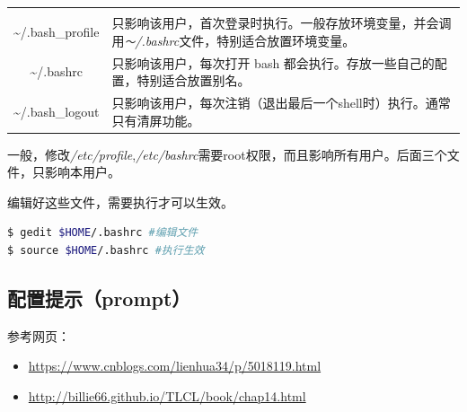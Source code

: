 \documentclass[doctor,openright,twoside]{sjtuthesis}
\providecommand{\tightlist}{%
    \setlength{\itemsep}{0pt}\setlength{\parskip}{0pt}}
\newcommand{\passthrough}[1]{#1}
\theoremstyle{plain}
\theoremstyle{definition}
\theoremstyle{remark}
\theoremstyle{ocrenumbox}
\theoremstyle{plain}
\begin{document}
\begin{longtable}[]{@{}cl@{}}
\begin{minipage}[t]{0.74\columnwidth}
\end{minipage}\tabularnewline
\begin{minipage}[t]{0.20\columnwidth}\centering
\textasciitilde{}/.bash\_profile\strut
\end{minipage} & \begin{minipage}[t]{0.74\columnwidth}\raggedright
只影响该用户，首次登录时执行。一般存放环境变量，并会调用\emph{\passthrough{\lstinline!～!}/.bashrc}文件，特别适合放置环境变量。\strut
\end{minipage}\tabularnewline
\begin{minipage}[t]{0.20\columnwidth}\centering
\textasciitilde{}/.bashrc\strut
\end{minipage} & \begin{minipage}[t]{0.74\columnwidth}\raggedright
只影响该用户，每次打开 bash
都会执行。存放一些自己的配置，特别适合放置别名。\strut
\end{minipage}\tabularnewline
\begin{minipage}[t]{0.20\columnwidth}\centering
\textasciitilde{}/.bash\_logout\strut
\end{minipage} & \begin{minipage}[t]{0.74\columnwidth}\raggedright
只影响该用户，每次注销（退出最后一个shell时）执行。通常只有清屏功能。\strut
\end{minipage}\tabularnewline
\bottomrule
\end{longtable}

一般，修改\emph{/etc/profile},\emph{/etc/bashrc}需要root权限，而且影响所有用户。后面三个文件，只影响本用户。

编辑好这些文件，需要执行才可以生效。

\begin{lstlisting}[language=bash]
$ gedit $HOME/.bashrc #编辑文件
$ source $HOME/.bashrc #执行生效
\end{lstlisting}

\hypertarget{prompt}{%
\subsection{配置提示（prompt）}\label{prompt}}

参考网页：

\begin{itemize}
\tightlist
\item
  \url{https://www.cnblogs.com/lienhua34/p/5018119.html}
\item
  \url{http://billie66.github.io/TLCL/book/chap14.html}
\end{itemize}
\end{document}
